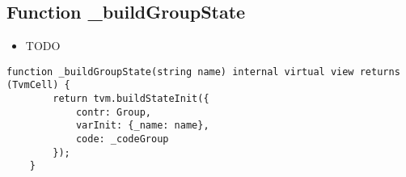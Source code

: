\subsection{Function \_{}buildGroupState}

\begin{itemize}
\item TODO
\end{itemize}

\begin{lstlisting}[firstnumber=16]
    function _buildGroupState(string name) internal virtual view returns (TvmCell) {
        return tvm.buildStateInit({
            contr: Group,
            varInit: {_name: name},
            code: _codeGroup
        });
    }
\end{lstlisting}
